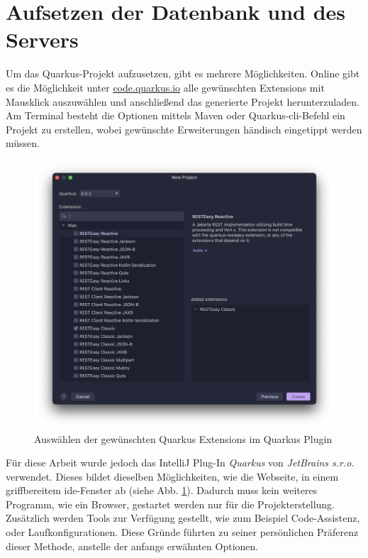 \section{Aufsetzen der Datenbank und des Servers}

Um das Quarkus-Projekt aufzusetzen, gibt es mehrere Möglichkeiten. 
Online gibt es die Möglichkeit unter \href{https://code.quarkus.io}{code.quarkus.io} alle gewünschten Extensions mit Mausklick auszuwählen und anschließend das generierte Projekt herunterzuladen. 
Am Terminal besteht die Optionen mittels Maven oder Quarkus-\gls{cli}-Befehl ein Projekt zu erstellen, wobei gewünschte Erweiterungen händisch eingetippt werden müssen.

\begin{figure}
    \centering
    \includegraphics[scale=0.35]{pics/quarkusplugin.png}
    \caption{Auswählen der gewünschten Quarkus Extensions im Quarkus Plugin}
    \label{fig:intellij:plugin}
\end{figure}

Für diese Arbeit wurde jedoch das IntelliJ Plug-In \emph{Quarkus} von \emph{JetBrains s.r.o.} verwendet. 
Dieses bildet dieselben Möglichkeiten, wie die Webseite, in einem griffbereitem \gls{ide}-Fenster ab (siehe Abb. \ref{fig:intellij:plugin}).
Dadurch muss kein weiteres Programm, wie ein Browser, gestartet werden nur für die Projekterstellung.
Zusätzlich werden Tools zur Verfügung gestellt, wie zum Beispiel Code-Assistenz, oder Laufkonfigurationen. \cite{QuarkusPlugin}
Diese Gründe führten zu seiner persönlichen Präferenz dieser Methode, anstelle der anfangs erwähnten Optionen.

